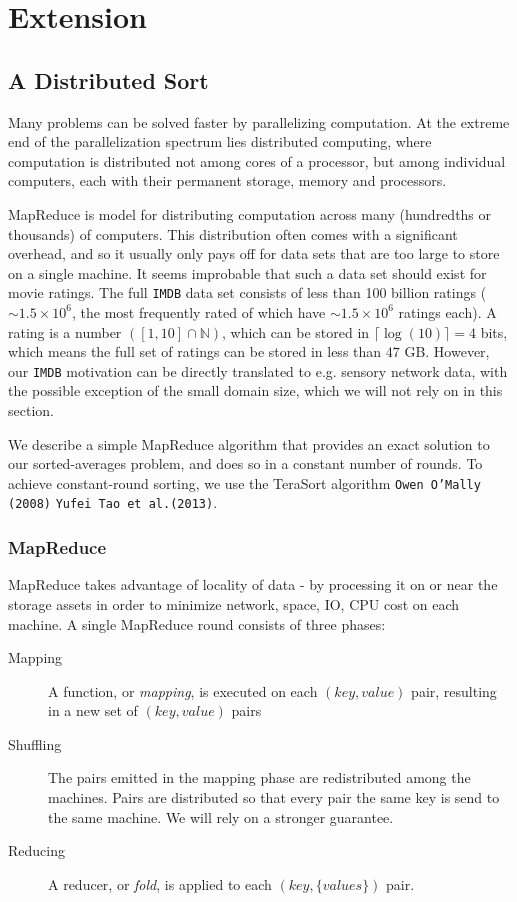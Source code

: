 \chapter{Extension}
\section{A Distributed Sort}
Many problems can be solved faster by parallelizing computation. At the extreme
end of the parallelization spectrum lies distributed computing, where
computation is distributed not among cores of a processor, but among individual
computers, each with their permanent storage, memory and processors.

MapReduce is model for distributing computation across many (hundredths or
thousands) of computers. This distribution often comes with a significant
overhead, and so it usually only pays off for data sets that are too large to
store on a single machine. It seems improbable that such a data set should exist
for movie ratings. The full \texttt{IMDB} data set consists of less than
100 billion ratings ($\sim 1.5 \times 10^6$, the most frequently rated of which
have $\sim 1.5 \times 10^6$ ratings each). A rating is a number
$\left(\left[1,10\right]\cap \mathbb{N}\right)$, which can be stored in
$\lceil \log(10)\rceil = 4$ bits, which means the full set of ratings can be
stored in less than $47$ GB. However, our \texttt{IMDB} motivation can be
directly translated to e.g. sensory network data, with the possible exception of
the small domain size, which we will not rely on in this section.

We describe a simple MapReduce algorithm that provides an exact solution to our
sorted-averages problem, and does so in a constant number of rounds. To achieve
constant-round sorting, we use the TeraSort algorithm \texttt{Owen O'Mally
(2008)}\citep{terabytesort} \texttt{Yufei Tao et
al.(2013)}\citep{minimalmapreduce}.

\subsection{MapReduce}
MapReduce takes advantage of locality of data - by processing it on 
or near the storage assets in order to minimize network, space, IO, CPU cost on each machine.
A single MapReduce round consists of three phases:

\begin{description}
	\item [Mapping] A function, or \textit{mapping}, is executed on each $(key,
		value)$ pair, resulting in a new set of $(key,value)$ pairs
	\item [Shuffling] The pairs emitted in the mapping phase are redistributed among
		the machines. Pairs are distributed so that every pair the
		same key is send to the same machine. We will rely on a stronger
		guarantee.
	\item [Reducing] A reducer, or \textit{fold}, is applied to each $(key,
		\{values\})$ pair.
\end{description}

